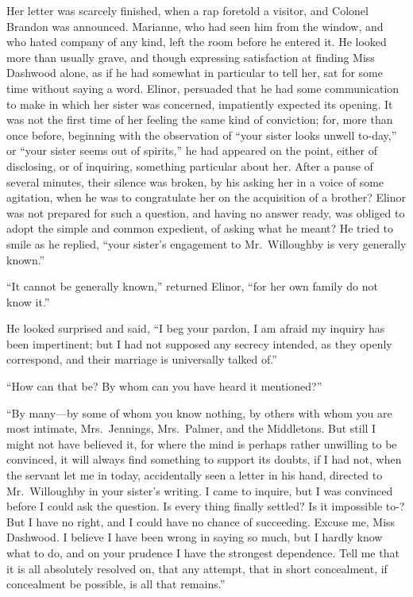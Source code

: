 \documentclass{article}
\begin{document}
Her letter was scarcely finished, when a rap
foretold a visitor, and Colonel Brandon was announced.
Marianne, who had seen him from the window, and who hated
company of any kind, left the room before he entered it.
He looked more than usually grave, and though expressing
satisfaction at finding Miss Dashwood alone, as if he
had somewhat in particular to tell her, sat for some
time without saying a word.  Elinor, persuaded that he
had some communication to make in which her sister
was concerned, impatiently expected its opening.
It was not the first time of her feeling the same kind
of conviction; for, more than once before, beginning with
the observation of ``your sister looks unwell to-day,''
or ``your sister seems out of spirits,'' he had appeared
on the point, either of disclosing, or of inquiring,
something particular about her.  After a pause of several
minutes, their silence was broken, by his asking her
in a voice of some agitation, when he was to congratulate
her on the acquisition of a brother?  Elinor was not
prepared for such a question, and having no answer ready,
was obliged to adopt the simple and common expedient,
of asking what he meant?  He tried to smile as he replied,
``your sister's engagement to Mr.\ Willoughby is very generally
known.''

``It cannot be generally known,'' returned Elinor,
``for her own family do not know it.''

He looked surprised and said, ``I beg your pardon,
I am afraid my inquiry has been impertinent; but I had not
supposed any secrecy intended, as they openly correspond,
and their marriage is universally talked of.''

``How can that be? By whom can you have heard
it mentioned?''

``By many---by some of whom you know nothing, by others
with whom you are most intimate, Mrs.\ Jennings, Mrs.\ Palmer,
and the Middletons.  But still I might not have believed it,
for where the mind is perhaps rather unwilling to
be convinced, it will always find something to support
its doubts, if I had not, when the servant let me in today,
accidentally seen a letter in his hand, directed to
Mr.\ Willoughby in your sister's writing.  I came to inquire,
but I was convinced before I could ask the question.
Is every thing finally settled?  Is it impossible to-?
But I have no right, and I could have no chance of succeeding.
Excuse me, Miss Dashwood.  I believe I have been wrong
in saying so much, but I hardly know what to do, and on
your prudence I have the strongest dependence.  Tell me
that it is all absolutely resolved on, that any attempt,
that in short concealment, if concealment be possible,
is all that remains.''
\end{document}
